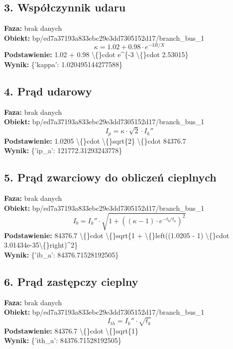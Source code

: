 ﻿\documentclass[11pt]{article}
\begin{document}
\subsection*{3. Współczynnik udaru}
\textbf{Faza:} brak danych\\
\textbf{Obiekt:} bp/ed7a37193a833ebc29e3dd7305152d17/branch\_bus\_1\\
\[
\kappa = 1.02 + 0.98 \cdot e^{-3 R/X}
\]
\textbf{Podstawienie:} 1.02 + 0.98 \textbackslash\{\}cdot e\textasciicircum{}\{-3 \textbackslash\{\}cdot 2.53015\}\\
\textbf{Wynik:} \{'kappa': 1.020495144277588\}\\
\subsection*{4. Prąd udarowy}
\textbf{Faza:} brak danych\\
\textbf{Obiekt:} bp/ed7a37193a833ebc29e3dd7305152d17/branch\_bus\_1\\
\[
I_p = \kappa \cdot \sqrt{2} \cdot I_{k}''
\]
\textbf{Podstawienie:} 1.0205 \textbackslash\{\}cdot \textbackslash\{\}sqrt\{2\} \textbackslash\{\}cdot 84376.7\\
\textbf{Wynik:} \{'ip\_a': 121772.31293243778\}\\
\subsection*{5. Prąd zwarciowy do obliczeń cieplnych}
\textbf{Faza:} brak danych\\
\textbf{Obiekt:} bp/ed7a37193a833ebc29e3dd7305152d17/branch\_bus\_1\\
\[
I_b = I_{k}'' \cdot \sqrt{1 + ((\kappa - 1) \cdot e^{-t_b/t_a})^2}
\]
\textbf{Podstawienie:} 84376.7 \textbackslash\{\}cdot \textbackslash\{\}sqrt\{1 + \textbackslash\{\}left((1.0205 - 1) \textbackslash\{\}cdot 3.01434e-35\textbackslash\{\}right)\textasciicircum{}2\}\\
\textbf{Wynik:} \{'ib\_a': 84376.71528192505\}\\
\subsection*{6. Prąd zastępczy cieplny}
\textbf{Faza:} brak danych\\
\textbf{Obiekt:} bp/ed7a37193a833ebc29e3dd7305152d17/branch\_bus\_1\\
\[
I_{th} = I_{k}'' \cdot \sqrt{t_k}
\]
\textbf{Podstawienie:} 84376.7 \textbackslash\{\}cdot \textbackslash\{\}sqrt\{1\}\\
\textbf{Wynik:} \{'ith\_a': 84376.71528192505\}\\
\end{document}
